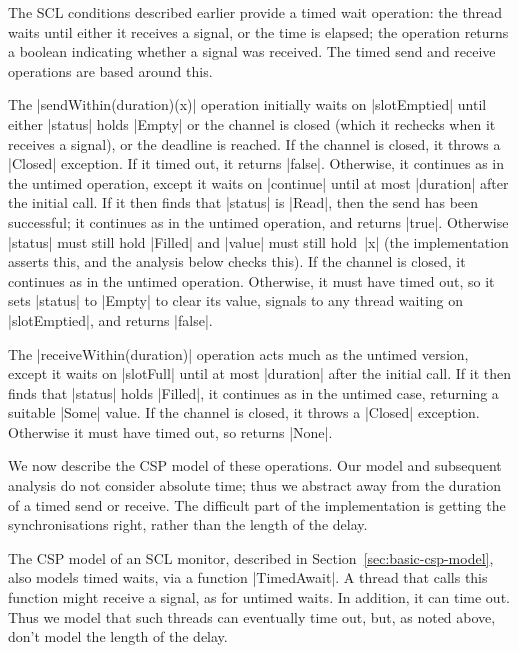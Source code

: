 The SCL conditions described earlier provide a timed wait operation: the
thread waits until either it receives a signal, or the time is elapsed; the
operation returns a boolean indicating whether a signal was received.  The
timed send and receive operations are based around this. 

The |sendWithin(duration)(x)| operation initially waits on |slotEmptied| until
either |status| holds |Empty| or the channel is closed (which it rechecks when
it receives a signal), or the deadline is reached.  If the channel is closed,
it throws a |Closed| exception.  If it timed out, it returns |false|.
Otherwise, it continues as in the untimed operation, except it waits on
|continue| until at most |duration| after the initial call.  If it then finds
that |status| is |Read|, then the send has been successful; it continues as in
the untimed operation, and returns |true|.  Otherwise |status| must still hold
|Filled| and |value| must still hold~|x| (the implementation asserts this, and
the analysis below checks this).  If the channel is closed, it continues as in
the untimed operation.  Otherwise, it must have timed out, so it sets |status|
to |Empty| to clear its value, signals to any thread waiting on |slotEmptied|,
and returns |false|.

The |receiveWithin(duration)| operation acts much as the untimed version,
except it waits on |slotFull| until at most |duration| after the initial
call.  If it then finds that |status| holds |Filled|, it continues as in the
untimed case, returning a suitable |Some| value.  If the channel is closed, it
throws a |Closed| exception.  Otherwise it must have timed out, so returns
|None|.  


We now describe the CSP model of these operations.  Our model and subsequent
analysis do not consider absolute time; thus we abstract away from the
duration of a timed send or receive.  The difficult part of the implementation
is getting the synchronisations right, rather than the length of the delay.

The CSP model of an SCL monitor, described in
Section~\ref{sec:basic-csp-model}, also models timed waits, via a function
|TimedAwait|.  A thread that calls this function might receive a signal, as
for untimed waits.  In addition, it can time out.  Thus we model that such
threads can eventually time out, but, as noted above, don't model the length
of the delay.



